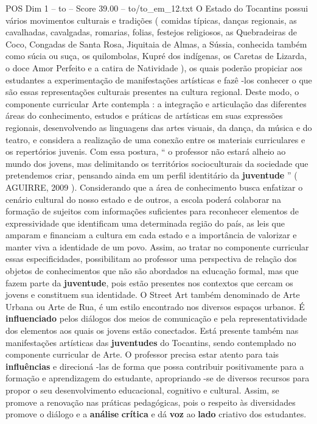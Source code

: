 \begin{textsample}{POS Dim 1 – to – Score 39.00 – to/to\_em\_12.txt}
O Estado do Tocantins possui vários movimentos culturais e tradições ( comidas típicas, danças regionais, as cavalhadas, cavalgadas, romarias, folias, festejos religiosos, as Quebradeiras de Coco, Congadas de Santa Rosa, Jiquitaia de Almas, a Sússia, conhecida também como súcia ou suça, os quilombolas, Kupré dos indígenas, os Caretas de Lizarda, o doce Amor Perfeito e a catira de Natividade ), os quais poderão propiciar aos estudantes a experimentação de manifestações artísticas e fazê -los conhecer o que são essas representações culturais presentes na cultura regional.
Deste modo, o componente curricular Arte contempla : a integração e articulação das diferentes áreas do conhecimento, estudos e práticas de artísticas em suas expressões regionais, desenvolvendo as linguagens das artes visuais, da dança, da música e do teatro, e considera a realização de uma conexão entre os materiais curriculares e os repertórios juvenis.
Com essa postura, “ o professor não estará alheio ao mundo dos jovens, mas delimitando os territórios socioculturais da sociedade que pretendemos criar, pensando ainda em um perfil identitário da \textbf{juventude} ” ( AGUIRRE, 2009 ).
Considerando que a área de conhecimento busca enfatizar o cenário cultural do nosso estado e de outros, a escola poderá colaborar na formação de sujeitos com informações suficientes para reconhecer elementos de expressividade que identificam uma determinada região do país, as leis que amparam e financiam a cultura em cada estado e a importância de valorizar e manter viva a identidade de um povo.
Assim, ao tratar no componente curricular essas especificidades, possibilitam ao professor uma perspectiva de relação dos objetos de conhecimentos que não são abordados na educação formal, mas que fazem parte da \textbf{juventude}, pois estão presentes nos contextos que cercam os jovens e constituem sua identidade.
O Street Art também denominado de Arte Urbana ou Arte de Rua, é um estilo encontrado nos diversos espaços urbanos.
É \textbf{influenciado} pelos diálogos dos meios de comunicação e pela representatividade dos elementos aos quais os jovens estão conectados.
Está presente também nas manifestações artísticas das \textbf{juventudes} do Tocantins, sendo contemplado no componente curricular de Arte.
O professor precisa estar atento para tais \textbf{influências} e direcioná -las de forma que possa contribuir positivamente para a formação e aprendizagem do estudante, apropriando -se de diversos recursos para propor o seu desenvolvimento educacional, cognitivo e cultural.
Assim, se promove a renovação nas práticas pedagógicas, pois o respeito às diversidades promove o diálogo e a \textbf{análise} \textbf{crítica} e dá \textbf{voz} ao \textbf{lado} criativo dos estudantes.

\end{textsample}
